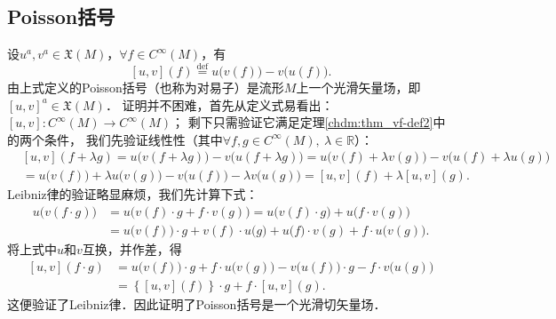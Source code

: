\subsection{Poisson括号}\label{chdm:sec_poisson-lie}
设$u^a,v^a \in \mathfrak{X}(M)$，$\forall f\in C^\infty(M)$，有
\begin{equation}\label{chdm:def_poisson-bracket}
    \left[u,v\right] (f) \overset{\mathrm {def}}{=} u\bigl(v(f)\bigr) - v\bigl(u(f)\bigr) .
\end{equation}
由上式定义的Poisson括号（也称为对易子）是流形$M$上一个光滑矢量场，即$[u,v]^a \in \mathfrak{X}(M)$．
证明并不困难，首先从定义式易看出：$\left[u,v\right]:C^\infty(M)\to C^\infty(M)$；
剩下只需验证它满足定理\ref{chdm:thm_vf-def2}中的两个条件，
我们先验证线性性（其中$\forall f,g \in C^\infty(M),\ \lambda \in \mathbb{R} $）：
\begin{align*}
    &\left[u,v\right] (f + \lambda g) = u\bigl(v(f + \lambda g)\bigr) - v\bigl(u(f + \lambda g)\bigr) 
    =u\bigl(v(f)+\lambda v(g)\bigr)- v\bigl(u(f)+\lambda u(g)\bigr) \\
    &=u\bigl(v(f)\bigr)+ \lambda u\bigl(v(g)\bigr) - v\bigl(u(f)\bigr) - \lambda v\bigl( u(g)\bigr) 
    =\left[u,v\right] (f ) + \lambda \left[u,v\right] ( g) .
\end{align*} 
Leibniz律的验证略显麻烦，我们先计算下式：
\begin{align*}
    u\bigl(v(f \cdot g)\bigr) &= u\bigl( v(f) \cdot g+ f \cdot v( g)\bigr)    
      = u\bigl( v(f) \cdot g\bigr) + u\bigl( f \cdot v( g)\bigr) \\
      &= u\bigl( v(f) \bigr) \cdot g + v(f) \cdot u\bigl(  g\bigr) 
      + u\bigl( f \bigr) \cdot v(g) + f \cdot u\bigl( v( g)\bigr) .
\end{align*}
将上式中$u$和$v$互换，并作差，得
\begin{align*}
    \left[u,v\right] (f \cdot g) &= u\bigl( v(f) \bigr) \cdot g + f \cdot u\bigl( v( g)\bigr)
      -v\bigl( u(f) \bigr) \cdot g - f \cdot v\bigl( u( g)\bigr) \\
      & =\left\{ \left[u,v\right](f) \right\} \cdot g + f \cdot \left[u,v\right]  (g) .
\end{align*}
这便验证了Leibniz律．因此证明了Poisson括号是一个光滑切矢量场．

